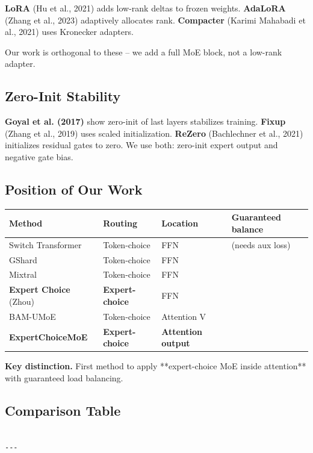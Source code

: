 \textbf{LoRA} (Hu et al., 2021) adds low-rank deltas to frozen weights. 
\textbf{AdaLoRA} (Zhang et al., 2023) adaptively allocates rank. \textbf{Compacter} 
(Karimi Mahabadi et al., 2021) uses Kronecker adapters.

Our work is orthogonal to these -- we add a full MoE block, not a low-rank 
adapter.

\subsection{Zero-Init Stability}

\textbf{Goyal et al. (2017)} show zero-init of last layers stabilizes training. 
\textbf{Fixup} (Zhang et al., 2019) uses scaled initialization. \textbf{ReZero} 
(Bachlechner et al., 2021) initializes residual gates to zero. We use both: 
zero-init expert output and negative gate bias.

\subsection{Position of Our Work}

\begin{table}[H]
\centering
\small
\begin{tabular}{llll}
\toprule
\textbf{Method} & \textbf{Routing} & \textbf{Location} & \textbf{Guaranteed balance} \\
\midrule
Switch Transformer & Token-choice & FFN & (needs aux loss) \\
GShard & Token-choice & FFN &  \\
Mixtral & Token-choice & FFN &  \\
\textbf{Expert Choice} (Zhou) & \textbf{Expert-choice} & FFN &  \\
BAM-UMoE & Token-choice & Attention V &  \\
\textbf{ExpertChoiceMoE} & \textbf{Expert-choice} & \textbf{Attention output} &  \\
\bottomrule
\end{tabular}
\end{table}

\textbf{Key distinction.} First method to apply **expert-choice MoE inside 
attention** with guaranteed load balancing.



\subsection{Comparison Table}

\begin{lstlisting}

---
\end{lstlisting}